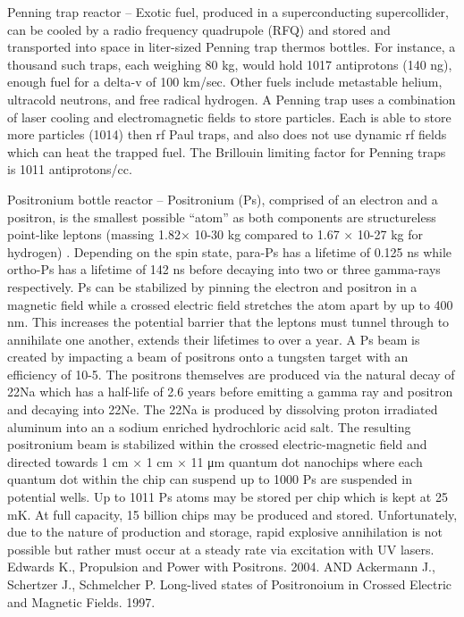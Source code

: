 \documentclass[a4paper]{book}
\begin{document}
Penning trap reactor – Exotic fuel, produced in a superconducting supercollider, can be cooled by a radio frequency quadrupole (RFQ) and stored and transported into space in liter-sized Penning trap thermos bottles. For instance, a thousand such traps, each weighing 80 kg, would hold 1017 antiprotons (140 ng), enough fuel for a delta-v of 100 km/sec.  Other fuels include metastable helium, ultracold neutrons, and free radical hydrogen.  A Penning trap uses a combination of laser cooling and electromagnetic fields to store particles. Each is able to store more particles (1014) then rf Paul traps, and also does not use dynamic rf fields which can heat the trapped fuel.  The Brillouin limiting factor for Penning traps is 1011 antiprotons/cc. 
 
Positronium bottle reactor – Positronium (Ps), comprised of an electron and a positron, is the smallest possible “atom” as both components are structureless point-like leptons (massing 1.82× 10-30 kg compared to 1.67 × 10-27 kg for hydrogen) .  Depending on the spin state, para-Ps has a lifetime of 0.125 ns while ortho-Ps has a lifetime of 142 ns before decaying into two or three gamma-rays respectively.  Ps can be stabilized by pinning the electron and positron in a magnetic field while a crossed electric field stretches the atom apart by up to 400 nm.  This increases the potential barrier that the leptons must tunnel through to annihilate one another, extends their lifetimes to over a year.
A Ps beam is created by impacting a beam of positrons onto a tungsten target with an efficiency of 10-5.  The positrons themselves are produced via the natural decay of 22Na which has a half-life of 2.6 years before emitting a gamma ray and positron and decaying into 22Ne.  The 22Na is produced by dissolving proton irradiated aluminum into an a sodium enriched hydrochloric acid salt. The resulting positronium beam is stabilized within the crossed electric-magnetic field and directed towards 1 cm × 1 cm × 11 μm quantum dot nanochips where each quantum dot within the chip can suspend up to 1000 Ps are suspended in potential wells.  Up to 1011 Ps atoms may be stored per chip which is kept at 25 mK.  At full capacity, 15 billion chips may be produced and stored. Unfortunately, due to the nature of production and storage, rapid explosive annihilation is not possible but rather must occur at a steady rate via excitation with UV lasers.
Edwards K., Propulsion and Power with Positrons. 2004. AND Ackermann J., Schertzer J., Schmelcher P. Long-lived states of Positronoium in Crossed Electric and Magnetic Fields. 1997.
 
\end{document}
